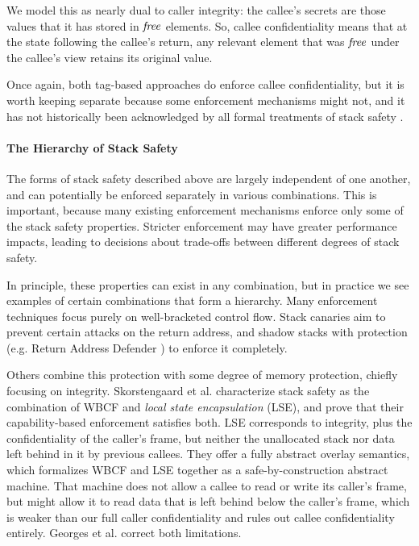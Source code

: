 \documentclass[10pt,conference]{ieeetran}%
\theoremstyle{definition}
\begin{document}
We model this as nearly dual to caller integrity: the callee's secrets are those
values that it has stored in \(\mathit{free}\) elements. So, callee confidentiality means that
at the state following the callee's return, any relevant element that was \(\mathit{free}\) under
the callee's view retains its original value.

Once again, both tag-based approaches do enforce callee confidentiality, but it is
worth keeping separate because some enforcement mechanisms might not, and it has not
historically been acknowledged by all formal treatments of stack safety \cite{Georges22:TempsDesCerise}.

\paragraph*{The Hierarchy of Stack Safety}

The forms of stack safety described above are largely independent of one another, and
can potentially be enforced separately in various combinations. This is important, because
many existing enforcement mechanisms enforce only some of the stack safety
properties. Stricter enforcement may have greater performance impacts, leading to decisions
about trade-offs between different degrees of stack safety.

In principle, these properties can exist in any combination, but in practice we see examples
of certain combinations that form a hierarchy. Many enforcement techniques focus purely on
well-bracketed control flow. Stack canaries aim to prevent certain attacks on the return
address, and shadow stacks with protection (e.g. Return Address Defender \cite{Chiueh2001RAD})
to enforce it completely.

Others combine this protection with some degree of memory protection,
chiefly focusing on integrity. Skorstengaard et al. \cite{SkorstengaardSTK} characterize stack
safety as the combination of WBCF and {\it local state encapsulation} (LSE), and prove that their
capability-based enforcement satisfies both. LSE corresponds to integrity, plus the
confidentiality of the caller's frame, but neither the unallocated stack nor data left
behind in it by previous callees.
They offer a fully abstract overlay semantics, which formalizes WBCF and LSE
together as a safe-by-construction abstract machine. That machine does not allow a callee to
read or write its caller's frame, but might allow it to read data that is left behind below
the caller's frame, which is weaker than our full caller confidentiality and rules out
callee confidentiality entirely. Georges et al. \cite{Georges22:TempsDesCerises} correct
both limitations.
\end{document}
